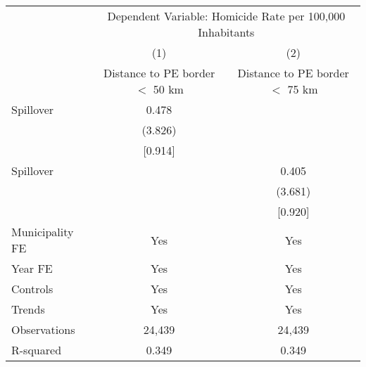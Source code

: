 \documentclass[]{article}
\begin{document}
\begin{table}[htbp]
\centering
\begin{threeparttable}
\caption{}
\label{tab:spillover}
\begin{tabular}{lcc}
\toprule
& \multicolumn{2}{c}{Dependent Variable: Homicide Rate per 100,000 Inhabitants} \\
\cmidrule(l){2-3} 
& (1) & (2) \\ 
& Distance to PE border $<$ 50 km & Distance to PE border $<$ 75 km \\ 
\midrule
Spillover & 0.478 &  \\
& (3.826) &  \\
& [0.914] &  \\
Spillover &  & 0.405 \\
&  & (3.681) \\
&  & [0.920] \\
\midrule
Municipality FE & Yes & Yes \\
Year FE & Yes & Yes \\
Controls & Yes & Yes \\
Trends & Yes & Yes \\
Observations & 24,439 & 24,439 \\
R-squared & 0.349 & 0.349 \\
\bottomrule
\end{tabular}
\end{threeparttable}
\end{table}
\end{document}
